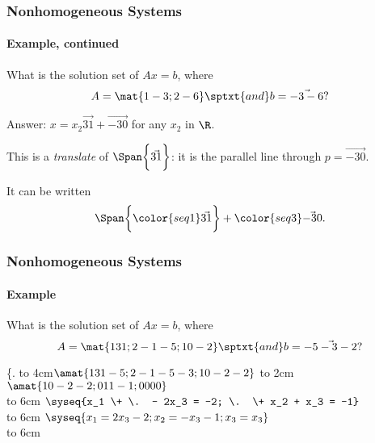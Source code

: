 \begin{frame}
\frametitle{Nonhomogeneous Systems}
\framesubtitle{Example, continued}

\vskip-3mm
\begin{ques}
  What is the solution set of $Ax=b$, where
  \[ A = \mat{1 -3; 2 -6} \sptxt{and} b = \vec{-3 -6}? \]
\end{ques}

\alert{Answer: } $x = x_2\vec{3 1} + \vec{-3 0}$ for any $x_2$ in $\R$.

\pause\smallskip
This is a \emph{translate} of 
$\Span\biggl\{\vec{3 1}\biggr\}$: it is the
parallel line through $p = \vec{-3 0}$.  

\pause\medskip
\begin{center}
\quad
\begin{minipage}[c]{0.4\linewidth}
  \pause
It can be written
\[\Span\biggl\{{\color{seq1}\vec{3 1}}\biggr\} + \color{seq3}\vec{-3 0}.\]
\end{minipage}
\end{center}

\end{frame}



\begin{frame}
\frametitle{Nonhomogeneous Systems}
\framesubtitle{Example}

\vskip-3mm
\begin{ques}
  What is the solution set of $Ax=b$, where
  \[ A = \mat{1 3 1; 2 -1 -5; 1 0 -2} \sptxt{and} b = \vec{-5 -3 -2}? \]
\end{ques}

\begin{webonly}
\spalignsysdelims\{.
\leavevmode
\hbox to 4cm{\hfil$\amat{1 3 1 -5; 2 -1 -5 -3; 1 0 -2 -2}$}%
\hbox to 2cm{\hfil{}}
\quad$\amat{1 0 -2 -2; 0 1 1 -1; 0 0 0 0}$\\[2mm]
\leavevmode
\hbox to 6cm{\hfil\longsquiggly[equations]}\quad 
$\syseq{x_1 \+ \. - 2x_3 = -2; \. \+ x_2 + x_3 = -1}$\\[2mm]
\leavevmode
\hbox to 6cm{\hfil{}}\quad 
$\syseq{
  x_1 = 2x_3 - 2; 
  x_2 = -x_3 - 1; 
  x_3 = x_3}$\\[2mm]
\leavevmode
\hbox to 6cm{\hfil{}}\quad 
{}
\end{webonly}

\end{frame}


